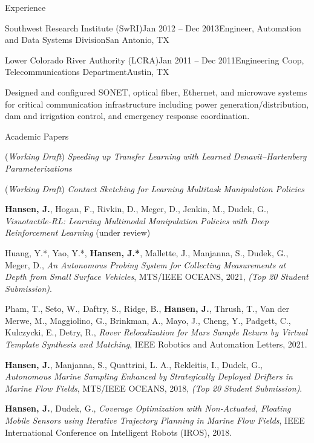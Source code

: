 \documentclass{resume} %
\begin{document}
\begin{rSection}{Experience}
\begin{rSubsection}{Southwest Research Institute (SwRI)}{Jan 2012 -- Dec 2013}{Engineer, Automation and Data Systems Division}{San Antonio, TX}{}
\end{rSubsection}
\begin{rSubsection}{Lower Colorado River Authority (LCRA)}{Jan 2011 -- Dec 2011}{Engineering Coop, Telecommunications Department}{Austin, TX}
\item{Designed and configured SONET, optical fiber, Ethernet, and microwave systems for critical communication infrastructure including power generation/distribution, dam and irrigation control, and emergency response coordination. }
\end{rSubsection}
\end{rSection}
	\vspace{-.5cm}
\begin{rSection}{Academic Papers}

(\emph{Working Draft}) \textit{Speeding up Transfer Learning with Learned Denavit–Hartenberg Parameterizations}

(\emph{Working Draft}) \textit{Contact Sketching for Learning Multitask Manipulation Policies}

\textbf{Hansen, J.}, Hogan, F., Rivkin, D., Meger, D., Jenkin, M., Dudek, G., \textit{Visuotactile-RL: Learning Multimodal Manipulation Policies with Deep Reinforcement Learning} (under review)

%

Huang, Y.*, Yao, Y.*, \textbf{Hansen, J.*}, Mallette, J., Manjanna, S., Dudek, G.,  Meger, D., \textit{An Autonomous Probing System for Collecting Measurements at Depth from Small Surface Vehicles}, MTS/IEEE OCEANS, 2021, \emph{{(Top 20 Student Submission)}}.

Pham, T., Seto, W., Daftry, S., Ridge, B., \textbf{Hansen, J.}, Thrush, T., Van der Merwe, M., Maggiolino, G., Brinkman, A., Mayo, J., Cheng, Y., Padgett, C., Kulczycki, E., Detry, R., \textit{Rover Relocalization for Mars Sample Return by Virtual Template Synthesis and Matching},  IEEE Robotics and Automation Letters, 2021.

\textbf{Hansen, J.}, Manjanna, S.,  Quattrini, L. A., Rekleitis, I., Dudek, G., \textit{Autonomous Marine Sampling Enhanced by Strategically Deployed Drifters in Marine Flow Fields}, MTS/IEEE OCEANS, 2018, \emph{{(Top 20 Student Submission)}}.

\textbf{Hansen, J.}, Dudek, G., \textit{Coverage Optimization with Non-Actuated, Floating Mobile Sensors using Iterative Trajectory Planning in Marine Flow Fields}, IEEE International Conference on Intelligent Robots (IROS), 2018.


\end{rSection}
\end{document}
